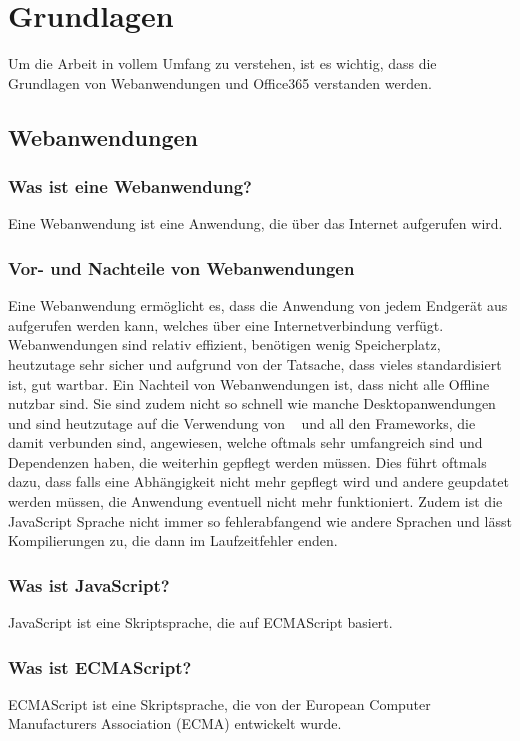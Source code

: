 
\section{Grundlagen}\label{sec:grundlagen}
Um die Arbeit in vollem Umfang zu verstehen, ist es wichtig, dass die Grundlagen von Webanwendungen und Office365 verstanden werden.
\subsection{Webanwendungen}\label{subsec:webanwendungen}

\subsubsection{Was ist eine Webanwendung?}
Eine Webanwendung ist eine Anwendung, die über das Internet aufgerufen wird.
\subsubsection{Vor- und Nachteile von Webanwendungen}
Eine Webanwendung ermöglicht es, dass die Anwendung von jedem Endgerät aus aufgerufen werden kann, welches über eine Internetverbindung verfügt.
Webanwendungen sind relativ effizient, benötigen wenig Speicherplatz, heutzutage sehr sicher und aufgrund von der Tatsache, dass vieles standardisiert ist, gut wartbar.
\newline
\newline
Ein Nachteil von Webanwendungen ist, dass nicht alle Offline nutzbar sind.
Sie sind zudem nicht so schnell wie manche Desktopanwendungen und sind heutzutage auf die Verwendung von ~\cite{JavaScript} und all den Frameworks, die damit verbunden sind, angewiesen, welche oftmals sehr umfangreich sind und Dependenzen haben, die weiterhin gepflegt werden müssen.
Dies führt oftmals dazu, dass falls eine Abhängigkeit nicht mehr gepflegt wird und andere geupdatet werden müssen, die Anwendung eventuell nicht mehr funktioniert.
Zudem ist die JavaScript Sprache nicht immer so fehlerabfangend wie andere Sprachen und lässt Kompilierungen zu, die dann im Laufzeitfehler enden.
\subsubsection{Was ist JavaScript?}
JavaScript ist eine Skriptsprache, die auf ECMAScript basiert.
\subsubsection{Was ist ECMAScript?}
ECMAScript ist eine Skriptsprache, die von der European Computer Manufacturers Association (ECMA) entwickelt wurde.

